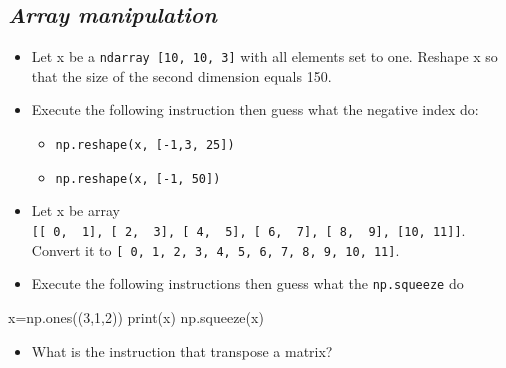 \documentclass[11pt]{article}
\providecommand{\tightlist}{%
      \setlength{\itemsep}{0pt}\setlength{\parskip}{0pt}}
\newenvironment{Shaded}{}{}
\newcommand{\DecValTok}[1]{\textcolor[rgb]{0.25,0.63,0.44}{{#1}}}
\newcommand{\NormalTok}[1]{{#1}}
\newcommand{\OperatorTok}[1]{\textcolor[rgb]{0.40,0.40,0.40}{{#1}}}
\newcommand{\BuiltInTok}[1]{{#1}}
\begin{document}
  \hypertarget{array-manipulation}{%
  \subsection{\texorpdfstring{\emph{Array
  manipulation}}{Array manipulation}}\label{array-manipulation}}

  \begin{itemize}
  \tightlist
  \item
    Let x be a \texttt{ndarray\ {[}10,\ 10,\ 3{]}} with all elements set
    to one. Reshape x so that the size of the second dimension equals
    150.
  \item
    Execute the following instruction then guess what the negative index do:

    \begin{itemize}
    \tightlist
    \item
      \texttt{np.reshape(x,\ {[}-1,3,\ 25{]})}
    \item
      \texttt{np.reshape(x,\ {[}-1,\ 50{]})}
    \end{itemize}
  \item
    Let x be array
    \texttt{{[}{[}\ 0,\ \ 1{]},\ {[}\ 2,\ \ 3{]},\ {[}\ 4,\ \ 5{]},\ {[}\ 6,\ \ 7{]},\ {[}\ 8,\ \ 9{]},\ {[}10,\ 11{]}{]}}.
    Convert it to
    \texttt{{[}\ 0,\ 1,\ 2,\ 3,\ 4,\ 5,\ 6,\ 7,\ 8,\ 9,\ 10,\ 11{]}}.
  \item
    Execute the following instructions then guess what the
    \texttt{np.squeeze} do
  \end{itemize}

\begin{Shaded}
\begin{tcolorbox}[breakable, size=fbox, boxrule=1pt, pad at break*=1mm,colback=cellbackground, colframe=cellborder]
  \begin{Highlighting}[]
\NormalTok{x}\OperatorTok{=}\NormalTok{np.ones((}\DecValTok{3}\NormalTok{,}\DecValTok{1}\NormalTok{,}\DecValTok{2}\NormalTok{))}
\BuiltInTok{print}\NormalTok{(x)}
\NormalTok{np.squeeze(x)}
\end{Highlighting}
\end{tcolorbox}
\end{Shaded}

  \begin{itemize}
  \tightlist
  \item
    What is the instruction that transpose a matrix?
  \end{itemize}

\end{document}
